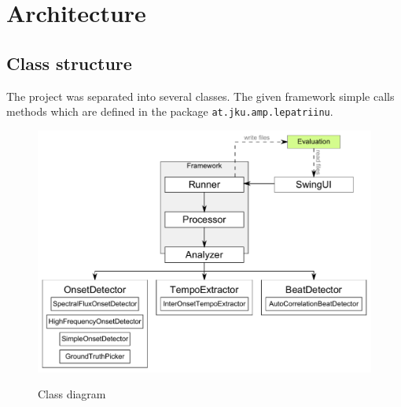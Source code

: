 \chapter{Architecture} \label{cpt:architecture}

\section{Class structure}
The project was separated into several classes. The given framework simple calls
methods which are defined in the package \texttt{at.jku.amp.lepatriinu}.


\begin{figure}[htp]
  \centering
  \includegraphics[width=\textwidth]{chapter/ClassDiagram}
  \label{fig:classdiagram}
  \caption{Class diagram}
\end{figure}